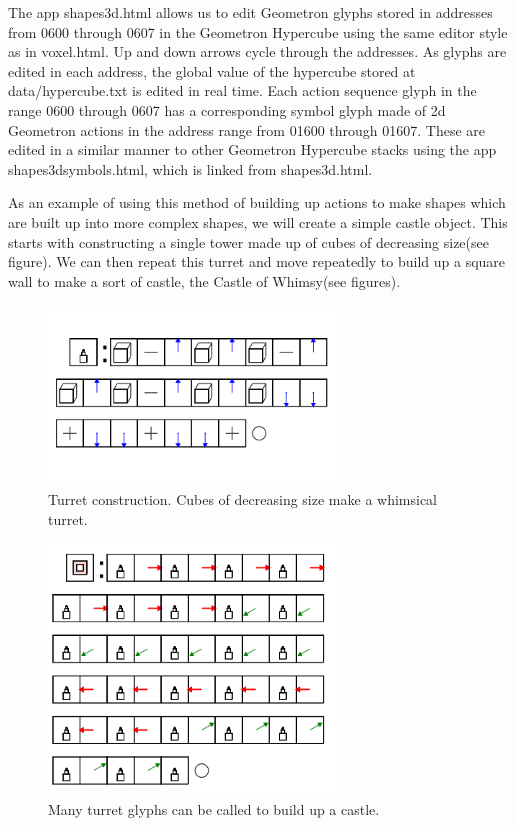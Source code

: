 The app shapes3d.html allows us to edit Geometron glyphs stored in addresses from 0600 through 0607 in the Geometron Hypercube using the same editor style as in voxel.html.  Up and down arrows cycle through the addresses.  As glyphs are edited in each address, the global value of the hypercube stored at data/hypercube.txt is edited in real time.  Each action sequence glyph in the range 0600 through 0607 has a corresponding symbol glyph made of 2d Geometron actions in the address range from 01600 through 01607.  These are edited in a similar manner to other Geometron Hypercube stacks using the app shapes3dsymbols.html, which is linked from shapes3d.html.  

As an example of using this method of building up actions to make shapes which are built up into more complex shapes, we will create a simple castle object.  This starts with constructing a single tower made up of cubes of decreasing size(see figure).  We can then repeat this turret and move repeatedly to build up a square wall to make a sort of castle, the Castle of Whimsy(see figures).  

\begin{figure}
	\centering
	\includegraphics[width=3in]{figures/geometron3d/whimsycastleturret.png}
	\caption[whimsycastleturret]
	{Turret construction. Cubes of decreasing size make a whimsical turret.}
\end{figure}

\begin{figure}
	\centering
	\includegraphics[width=3in]{figures/geometron3d/whimsycastlespelling.png}
	\caption[whimsycastlespelling]
	{Many turret glyphs can be called to build up a castle.}
\end{figure}

